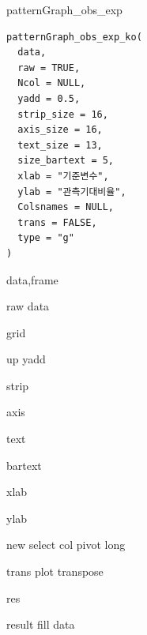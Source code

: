 \documentclass[a4paper]{book}
\begin{document}
%
\begin{Description}
patternGraph\_obs\_exp
\end{Description}
%
\begin{Usage}
\begin{verbatim}
patternGraph_obs_exp_ko(
  data,
  raw = TRUE,
  Ncol = NULL,
  yadd = 0.5,
  strip_size = 16,
  axis_size = 16,
  text_size = 13,
  size_bartext = 5,
  xlab = "기준변수",
  ylab = "관측기대비율",
  Colsnames = NULL,
  trans = FALSE,
  type = "g"
)
\end{verbatim}
\end{Usage}
%
\begin{Arguments}
\begin{ldescription}
\item[\code{data}] data,frame

\item[\code{raw}] raw data

\item[\code{Ncol}] grid

\item[\code{yadd}] up yadd

\item[\code{strip\_size}] strip

\item[\code{axis\_size}] axis

\item[\code{text\_size}] text

\item[\code{size\_bartext}] bartext

\item[\code{xlab}] xlab

\item[\code{ylab}] ylab

\item[\code{Colsnames}] new select col pivot long

\item[\code{trans}] trans plot transpose

\item[\code{type}] res
\end{ldescription}
\end{Arguments}
%
\begin{Value}
result fill data
\end{Value}
%
\end{document}
